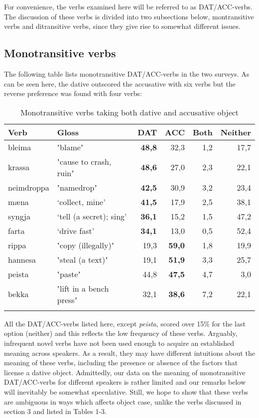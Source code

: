 \documentclass[output=paper,modfonts,nonflat,colorlinks,citecolor=brown]{langsci/langscibook}
\begin{document}
For convenience, the verbs examined here will be referred to as DAT/ACC-verbs. The discussion of these verbs is divided into two subsections below, montransitive verbs and ditransitive verbs, since they give rise to somewhat different issues.

\subsection{Monotransitive verbs} %

The following table lists monotransitive DAT/ACC-verbs in the two surveys. As can be seen here, the dative outscored the accusative with six verbs but the reverse preference was found with four verbs: 

\begin{table}
{\caption{\label{tab:jonsson:4}Monotransitive verbs taking both dative and accusative object} }
\begin{tabularx}{\textwidth}{XXrrrr}
\lsptoprule
Verb & Gloss & \textbf{DAT} & ACC & Both & Neither\\
\midrule
bleima & ʽblameʼ & \textbf{48,8} & 32,3 & 1,2 & 17,7\\
krassa & ʽcause to crash, ruinʼ & \textbf{48,6} & 27,0 & 2,3 & 22,1\\
neimdroppa & ʽnamedropʼ & \textbf{42,5} & 30,9 & 3,2 & 23,4\\
mæna & ‘collect, mine’ & \textbf{41,5} & 17,9 & 2,5 & 38,1\\
syngja & ‘tell (a secret); sing’ & \textbf{36,1} & 15,2 & 1,5 & 47,2\\
farta & ‘drive fast’ & \textbf{34,1} & 13,0 & 0,5 & 52,4\\
rippa & ʽcopy (illegally)ʼ & 19,3 & \textbf{59,0} & 1,8 & 19,9\\
hannesa & ʽsteal (a text)ʼ & 19,1 & \textbf{51,9} & 3,3 & 25,7\\
peista & ʽpasteʼ & 44,8 & \textbf{47,5} & 4,7 & 3,0\\
bekka & ʽlift in a bench pressʼ & 32,1 & \textbf{38,6} & 7,2 & 22,1\\
\lspbottomrule
\end{tabularx}
\end{table}

All the DAT/ACC-verbs listed here, except \textit{peista}, scored over 15\% for the last option (neither) and this reflects the low frequency of these verbs. Arguably, infrequent novel verbs have not been used enough to acquire an established meaning across speakers. As a result, they may have different intuitions about the meaning of these verbs, including the presence or absence of the factors that license a dative object. Admittedly, our data on the meaning of monotransitive DAT/ACC-verbs for different speakers is rather limited and our remarks below will inevitably be somewhat speculative. Still, we hope to show that these verbs are ambiguous in ways which affects object case, unlike the verbs discussed in section 3 and listed in Tables 1-3. 
\end{document}
